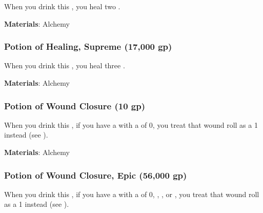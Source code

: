 When you drink this , you heal two .



\vspace{0.25em}
\textbf{Materials}: Alchemy


\lowercase{\hypertarget{item:Potion of Healing, Supreme}{}}\label{item:Potion of Healing, Supreme}
\hypertarget{item:Potion of Healing, Supreme}{\subsubsection{Potion of Healing, Supreme\hfill{} (17,000 gp)}}

When you drink this , you heal three .



\vspace{0.25em}
\textbf{Materials}: Alchemy


\lowercase{\hypertarget{item:Potion of Wound Closure}{}}\label{item:Potion of Wound Closure}
\hypertarget{item:Potion of Wound Closure}{\subsubsection{Potion of Wound Closure\hfill{} (10 gp)}}

When you drink this , if you have a  with a  of 0, you treat that wound roll as a 1 instead (see ).



\vspace{0.25em}
\textbf{Materials}: Alchemy


\lowercase{\hypertarget{item:Potion of Wound Closure, Epic}{}}\label{item:Potion of Wound Closure, Epic}
\hypertarget{item:Potion of Wound Closure, Epic}{\subsubsection{Potion of Wound Closure, Epic\hfill{} (56,000 gp)}}

When you drink this , if you have a  with a  of 0, , , or , you treat that wound roll as a 1 instead (see ).



